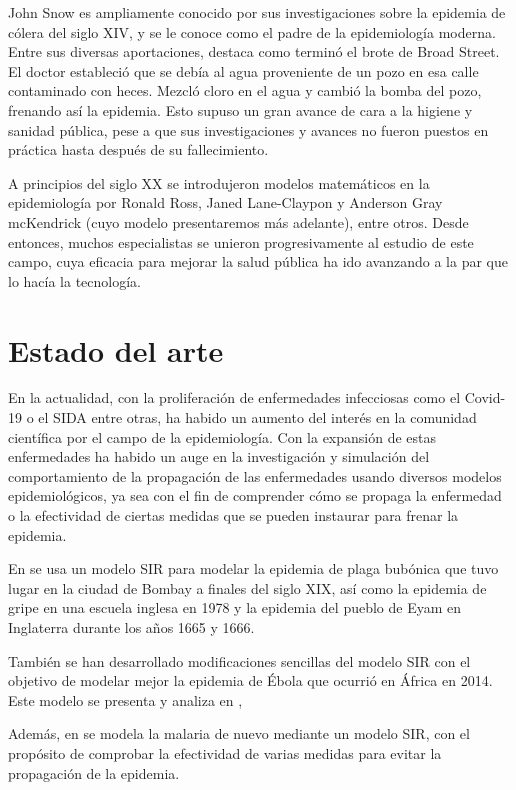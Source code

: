 John Snow es ampliamente conocido por sus investigaciones sobre la epidemia de cólera del siglo XIV, y se le conoce como el padre de la epidemiología moderna. Entre sus diversas aportaciones, destaca como terminó el brote de Broad Street. El doctor estableció que se debía al agua proveniente de un pozo en esa calle contaminado con heces. Mezcló cloro en el agua y cambió la bomba del pozo, frenando así la epidemia. Esto supuso un gran avance de cara a la higiene y sanidad pública, pese a que sus investigaciones y avances no fueron puestos en práctica hasta después de su fallecimiento.

A principios del siglo XX se introdujeron modelos matemáticos en la epidemiología por Ronald Ross, Janed Lane-Claypon y Anderson Gray mcKendrick (cuyo modelo presentaremos más adelante), entre otros. Desde entonces, muchos especialistas se unieron progresivamente al estudio de este campo, cuya eficacia para mejorar la salud pública ha ido avanzando a la par que lo hacía la tecnología.

\section*{Estado del arte}

En la actualidad, con la proliferación de enfermedades infecciosas como el Covid-19 o el SIDA entre otras, ha habido un aumento del interés en la comunidad científica por el campo de la epidemiología. Con la expansión de estas enfermedades ha habido un auge en la investigación y simulación del comportamiento de la propagación de las enfermedades usando diversos modelos epidemiológicos, ya sea con el fin de comprender cómo se propaga la enfermedad o la efectividad de ciertas medidas que se pueden instaurar para frenar la epidemia.

En \cite{sulsky2012using} se usa un modelo SIR para modelar la epidemia de plaga bubónica que tuvo lugar en la ciudad de Bombay a finales del siglo XIX, así como la epidemia de gripe en una escuela inglesa en 1978 y la epidemia del pueblo de Eyam en Inglaterra durante los años 1665 y 1666.

También se han desarrollado modificaciones sencillas del modelo SIR con el objetivo de modelar mejor la epidemia de Ébola que ocurrió en África en 2014. Este modelo se presenta y analiza en \cite{sirmodificadoebola},

Además, en \cite{kobe2015controlling} se modela la malaria de nuevo mediante un modelo SIR, con el propósito de comprobar la efectividad de varias medidas para evitar la propagación de la epidemia.


